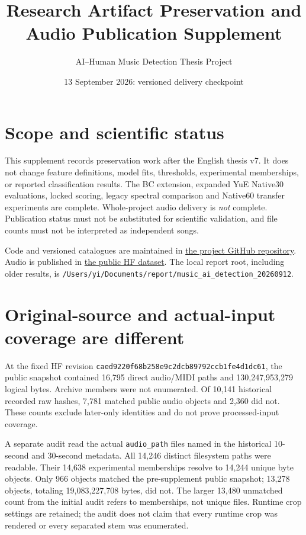 \documentclass[11pt]{article}
\title{Research Artifact Preservation and Audio Publication Supplement}
\author{AI--Human Music Detection Thesis Project}
\date{13 September 2026: versioned delivery checkpoint}
\begin{document}
\maketitle

\section{Scope and scientific status}
This supplement records preservation work after the English thesis v7. It
does not change feature definitions, model fits, thresholds, experimental
memberships, or reported classification results. The BC extension, expanded
YuE Native30 evaluations, locked scoring, legacy spectral comparison and
Native60 transfer experiments are complete. Whole-project audio delivery is
\emph{not} complete. Publication status must not be substituted for scientific
validation, and file counts must not be interpreted as independent songs.

Code and versioned catalogues are maintained in
\href{https://github.com/ezmonyi/ai-music-detection}{the project GitHub repository}.
Audio is published in
\href{https://huggingface.co/datasets/EZMONYI/music-ai-human-test-audio}{the public HF dataset}.
The local report root, including older results, is
\nolinkurl{/Users/yi/Documents/report/music_ai_detection_20260912}.

\section{Original-source and actual-input coverage are different}
At the fixed HF revision
\nolinkurl{caed9220f68b258e9c2dcb89792ccb1fe4d1dc61}, the public snapshot
contained 16,795 direct audio/MIDI paths and 130,247,953,279 logical bytes.
Archive members were not enumerated. Of 10,141 historical recorded raw hashes,
7,781 matched public audio objects and 2,360 did not. These counts exclude
later-only identities and do not prove processed-input coverage.

A separate audit read the actual \texttt{audio\_path} files named in the
historical 10-second and 30-second metadata. All 14,246 distinct filesystem
paths were readable. Their 14,638 experimental memberships resolve to 14,244
unique byte objects. Only 966 objects matched the pre-supplement public
snapshot; 13,278 objects, totaling 19,083,227,708 bytes, did not. The larger
13,480 unmatched count from the initial audit refers to memberships, not
unique files. Runtime crop settings are retained; the audit does not claim
that every runtime crop was rendered or every separated stem was enumerated.
\end{document}
